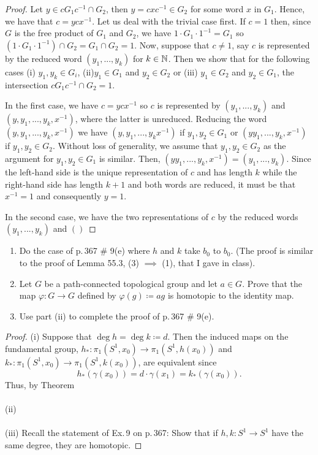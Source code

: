 \begin{proof}
Let $y\in cG_1c^{-1}\cap G_2$, then $y=cxc^{-1}\in G_2$ for some word $x$
in $G_1$. Hence, we have that $c=ycx^{-1}$. Let us deal with the trivial
case first. If $c=1$ then, since $G$ is the free product of $G_1$ and
$G_2$, we have $1\cdot G_1\cdot 1^{-1}=G_1$ so $(1\cdot G_1\cdot
1^{-1})\cap G_2=G_1\cap G_2=1$. Now, suppose that $c\neq 1$, say $c$ is
represented by the reduced word $(y_1,...,y_k)$ for $k\in\mathbb{N}$. Then we show
that for the following cases (i) $y_1,y_k\in G_i$, (ii)$y_1\in G_1$ and
$y_2\in G_2$ or (iii) $y_1\in G_2$ and $y_2\in G_1$, the intersection
$cG_1c^{-1}\cap G_2=1$.

In the first case, we have $c=ycx^{-1}$ so $c$ is represented by
$(y_1,...,y_k)$ and $(y,y_1,...,y_k,x^{-1})$, where the latter is
unreduced. Reducing the word $(y,y_1,...,y_k,x^{-1})$ we have
$(y,y_1,...,y_kx^{-1})$ if $y_1,y_2\in G_1$ or $(yy_1,...,y_k,x^{-1})$ if
$y_1,y_2\in G_2$. Without loss of generality, we assume that $y_1,y_2\in
G_2$ as the argument for $y_1,y_2\in G_1$ is similar. Then,
$(yy_1,...,y_k,x^{-1})=(y_1,...,y_k)$. Since the left-hand side is the
unique representation of $c$ and has length $k$ while the right-hand side
has length $k+1$ and both words are reduced, it must be that $x^{-1}=1$ and
consequently $y=1$.

In the second case, we have the two representations of $c$ by the reduced
words $(y_1,...,y_k)$ and $()$
\end{proof}
\newpage
\begin{problem}[A]
\begin{enumerate}[label=(\roman*)]
\item Do the case of p.\,367 \# 9(e) where $h$ and $k$ take $b_0$ to
  $b_0$. (The proof is similar to the proof of Lemma 55.3, (3) $\implies$
  (1), that I gave in class).
\item Let $G$ be a path-connected topological group and let $a\in G$. Prove
  that the map $\varphi\colon G\to G$ defined by $\varphi(g)\coloneqq ag$
  is homotopic to the identity map.
\item Use part (ii) to complete the proof of p.\,367 \# 9(e).
\end{enumerate}
\end{problem}
\begin{proof}
(i) Suppose that $\deg h=\deg k\coloneqq d$. Then the induced maps on the fundamental
group, $h_*\colon\pi_1(S^1,x_0)\to\pi_1(S^1,h(x_0))$ and
$k_*\colon\pi_1(S^1,x_0)\to\pi_1(S^1,k(x_0))$, are equivalent since
\[h_*(\gamma(x_0))=d\cdot\gamma(x_1)=k_*(\gamma(x_0)).\]
Thus, by Theorem
\\\\
(ii)
\\\\
(iii) Recall the statement of Ex.\,9 on p.\,367: Show that if $h,k\colon
S^1\to S^1$ have the same degree, they are homotopic.
\end{proof}
